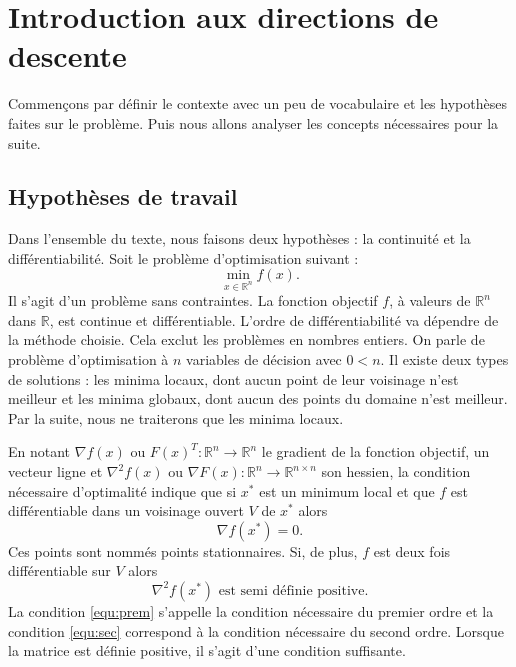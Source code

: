 







\section{Introduction aux directions de descente}
Commençons par d\'efinir le contexte avec un peu de vocabulaire et les hypoth\`eses faites sur le probl\`eme. Puis nous allons analyser
 les concepts n\'ecessaires pour la suite. 
\subsection{Hypoth\`eses de travail}
Dans l'ensemble du texte, nous faisons deux hypoth\`eses : la continuit\'e et la diff\'erentiabilit\'e.
Soit le probl\`eme d'optimisation suivant :
\begin{equation}
\min_{x\in \mathbb{R}^n} f(x).
\label{eq:princ}
\end{equation}
Il s'agit d'un probl\`eme sans contraintes. La fonction objectif $f$, \`a valeurs de
 $\mathbb{R}^n$ dans $\mathbb{R}$, est continue et diff\'erentiable. L'ordre de diff\'erentiabilit\'e va d\'ependre de la m\'ethode choisie. 
 Cela exclut les probl\`emes en nombres entiers. On parle de probl\`eme d'optimisation \`a $n$ variables de d\'ecision avec $0<n$. 
Il existe deux types de solutions : les minima locaux, dont aucun point de leur voisinage n'est meilleur et les minima globaux, dont aucun des points
du domaine n'est meilleur. Par la suite, nous ne traiterons que les minima locaux. 

En notant $\nabla f(x) $ ou $F(x)^T:\mathbb{R}^n\rightarrow \mathbb{R}^n$ le gradient de la fonction objectif, un vecteur ligne et 
$ \nabla^2f(x)$ ou $\nabla F(x): \mathbb{R}^n\rightarrow \mathbb{R}^{n\times n} $ son hessien, la condition n\'ecessaire d'optimalit\'e 
indique que si $x^*$ est un minimum local et que $f$ est diff\'erentiable dans un voisinage ouvert $V$ de $x^*$ alors 
\begin{equation}
\label{equ:prem}
\nabla f(x^*)=0.
\end{equation}
Ces points sont nomm\'es points stationnaires.
Si, de plus, $f$ est deux fois diff\'erentiable sur $V$ alors 
\begin{equation}
\label{equ:sec}
\nabla^2 f(x^*) \text{ est semi d\'efinie positive.}
\end{equation}
La condition \eqref{equ:prem} s'appelle la condition n\'ecessaire du premier ordre et la condition \eqref{equ:sec} correspond \`a la condition n\'ecessaire du second ordre.
Lorsque la matrice est d\'efinie positive, il s'agit d'une condition suffisante.


